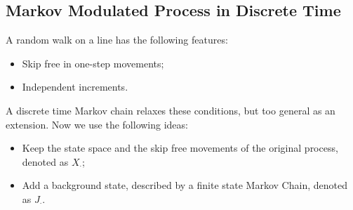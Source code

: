 \subsection{Markov Modulated Process in Discrete Time}
A random walk on a line has the following features:
\begin{itemize}
\item
Skip free in one-step movements;
\item
Independent increments.
\end{itemize}
A discrete time Markov chain relaxes these conditions, but too general as an extension.
Now we use the following ideas:
\begin{itemize}
\item
Keep the state space and the skip free movements of the original process, denoted as $X_{\cdot}$;
\item
Add a background state, described by a finite state Markov Chain, denoted as $J_{\cdot}$.
\end{itemize}

